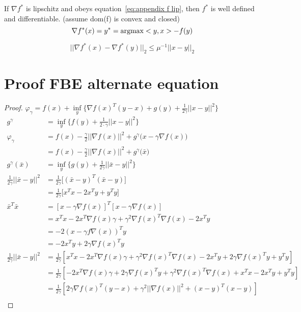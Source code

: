 		If $\nabla f^*$ is lipschitz and obeys equation~\ref{eq:appendix f lip}, then $f^*$ is well defined and differentiable. (assume dom(f) is convex and closed)
		\begin{equation}
			\nabla f^*(x) = y^* = \operatorname{argmax} <y,x> - f(y)
		\end{equation}
		
		\begin{equation}
			|| \nabla f^*(x) - \nabla f^*(y) ||_2 \leq \mu^{-1} ||x-y||_2
			\label{eq:appendix f lip}
		\end{equation}
\clearpage
\section{Proof FBE alternate equation}

\begin{proof}
	$\varphi_{\gamma} =   f(x) + \underset{y}{\inf} \Big\{ \nabla f(x)^T(y-x) + g(y) + \frac{1}{2 \gamma} ||x-y||^2  \Big\} $
	\begin{align*}
	g^{\gamma} 	&=  \underset{y}{\inf} \big \{f(y)+\frac{1}{2 \cdot \gamma}||x-y||^2 \big \} \\
	\varphi_{\gamma} 
	&= f(x) - \frac{\gamma}{2}||\nabla f(x)||^2 + g^{\gamma} \big(x-\gamma \nabla f(x) \big) \\
	&= f(x) - \frac{\gamma}{2}||\nabla f(x)||^2 + g^{\gamma} \big(\bar{x} \big)\\
	g^{\gamma} (\bar{x})
	&=\underset{y}{\inf} \Big\{g(y)+\frac{1}{2 \gamma}||\bar{x}-y||^2 \Big\}	\\
	\frac{1}{2 \gamma}||\bar{x}-y||^2
	&=\frac{1}{2 \gamma} \Big [ (\bar{x}-y)^T(\bar{x}-y) \Big]\\
	&=\frac{1}{2 \gamma} \Big [ x^Tx - 2 x^Ty + y^Ty \Big]\\
	\bar{x}^T\bar{x}
	&=[x- \gamma \nabla f(x)]^T[x- \gamma \nabla f(x)] \\
	&= x^Tx -2x^T\nabla f(x) \gamma + \gamma^2 \nabla f(x)^T\nabla f(x)-2x^Ty \\
	&=-2(x-\gamma f\nabla(x))^Ty\\
	&=-2x^Ty + 2\gamma \nabla f(x)^Ty \\
	\frac{1}{2 \gamma}||\bar{x}-y||^2 
	& =\frac{1}{2 \gamma}[x^Tx-2x^T\nabla f(x) \gamma + \gamma^2 \nabla f(x)^T\nabla f(x) -2x^Ty + 2\gamma \nabla f(x)^Ty +y^Ty] \\
	& = \frac{1}{2 \gamma}[-2x^T\nabla f(x) \gamma  + 2\gamma \nabla f(x)^Ty + \gamma^2 \nabla f(x)^T\nabla f(x) +x^Tx -2x^Ty +y^Ty]\\
	&= \frac{1}{2 \gamma}[ 2\gamma \nabla f(x)^T(y-x) + \gamma^2||\nabla f(x)||^2 + (x-y)^T(x-y)]\\

\end{align*}
\end{proof}
